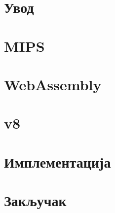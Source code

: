 \documentclass[12pt,oneside]{memoir}
\begin{document}
\frontmatter

\naslovna

\komisija

\posveta{}

\apstrakt

\tableofcontents*

\mainmatter

\chapter{Увод}

\chapter{MIPS}

\chapter{WebAssembly}

\chapter{v8}

\chapter{Имплементација}

\chapter{Закључак}

\literatura

\backmatter
\end{document}
